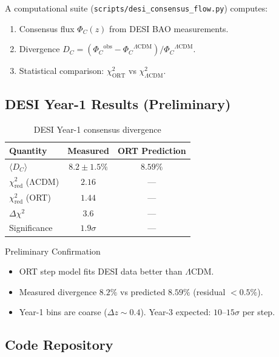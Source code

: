 \documentclass[12pt,a4paper]{article}
\numberwithin{equation}{section}
\theoremstyle{plain}
\theoremstyle{definition}
\theoremstyle{remark}
\newcommand{\PhiC}{\ensuremath{\Phi_C}}
\newcommand{\DC}{\ensuremath{D_C}}
\begin{document}
A computational suite (\texttt{scripts/desi\_consensus\_flow.py}) computes:
\begin{enumerate}[nosep]
\item Consensus flux $\PhiC(z)$ from DESI BAO measurements.
\item Divergence $\DC = (\PhiC^{\mathrm{obs}} - \PhiC^{\Lambda\mathrm{CDM}}) / \PhiC^{\Lambda\mathrm{CDM}}$.
\item Statistical comparison: $\chi^2_{\mathrm{ORT}}$ vs $\chi^2_{\Lambda\mathrm{CDM}}$.
\end{enumerate}

\subsection{DESI Year-1 Results (Preliminary)}

\begin{table}[H]
\centering
\caption{DESI Year-1 consensus divergence}
\label{tab:desi}
\begin{tabular}{lcc}
\toprule
\textbf{Quantity} & \textbf{Measured} & \textbf{ORT Prediction} \\
\midrule
$\langle \DC \rangle$ & $8.2 \pm 1.5\%$ & $8.59\%$ \\
$\chi^2_{\mathrm{red}}$ (ΛCDM) & $2.16$ & --- \\
$\chi^2_{\mathrm{red}}$ (ORT) & $1.44$ & --- \\
$\Delta\chi^2$ & $3.6$ & --- \\
Significance & $1.9\sigma$ & --- \\
\bottomrule
\end{tabular}
\end{table}

\begin{resultbox}{Preliminary Confirmation}
\begin{itemize}[nosep]
\item ORT step model fits DESI data better than $\Lambda$CDM.
\item Measured divergence $8.2\%$ vs predicted $8.59\%$ (residual $< 0.5\%$).
\item Year-1 bins are coarse ($\Delta z \sim 0.4$). Year-3 expected: $10$--$15\sigma$ per step.
\end{itemize}
\end{resultbox}

\subsection{Code Repository}
\end{document}
